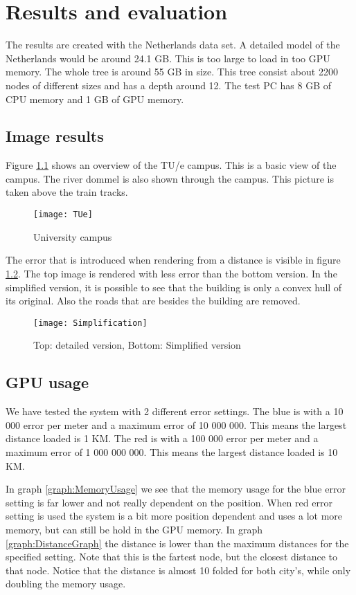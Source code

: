 \chapter{Results and evaluation}
\label{chap:ResultsAndEvaluation}
The results are created with the Netherlands data set. A detailed model of the Netherlands would be around 24.1 GB. This is too large to load in too GPU memory. The whole tree is around 55 GB in size. This tree consist about 2200 nodes of different sizes and has a depth around 12. The test PC has 8 GB of CPU memory and 1 GB of GPU memory.

\section{Image results}
\label{sec:ImageResults}
Figure \ref{fig:UniversityCampus} shows an overview of the TU/e campus. This is a basic view of the campus. The river dommel is also shown through the campus. This picture is taken above the train tracks.

\begin{figure}[htb!]
\centering
\texttt{[image: TUe]}
\caption{University campus}
\label{fig:UniversityCampus}
\end{figure}

The error that is introduced when rendering from a distance is visible in figure \ref{fig:Simplification}. The top image is rendered with less error than the bottom version. In the simplified version, it is possible to see that the building is only a convex hull of its original. Also the roads that are besides the building are removed.

\begin{figure}[htb!]
\centering
\texttt{[image: Simplification]}
\caption{Top: detailed version, Bottom: Simplified version}
\label{fig:Simplification}
\end{figure}

\section{GPU usage}
\label{sec:GPUUsage}
We have tested the system with 2 different error settings. The blue is with a 10 000 error per meter and a maximum error of 10 000 000. This means the largest distance loaded is 1 KM. The red is with a 100 000 error per meter and a maximum error of 1 000 000 000. This means the largest distance loaded is 10 KM.

In graph \ref{graph:MemoryUsage} we see that the memory usage for the blue error setting is far lower and not really dependent on the position. When red error setting is used the system is a bit more position dependent and uses a lot more memory, but can still be hold in the GPU memory. In graph \ref{graph:DistanceGraph} the distance is lower than the maximum distances for the specified setting. Note that this is the fartest node, but the closest distance to that node. Notice that the distance is almost 10 folded for both city's, while only doubling the memory usage.

